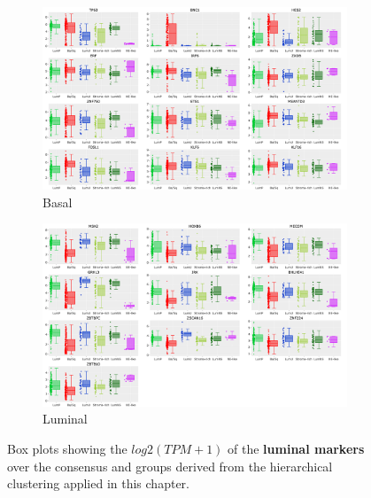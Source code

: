 \begin{figure}[!htb]
    \captionsetup[subfigure]{justification=Centering}
  \begin{subfigure}[!t]{0.95\textwidth}
    \includegraphics[width=1.0\textwidth,height=1.0\textheight,keepaspectratio]{Sections/Network_I/Resources/selective_pruning/log2_consensus_basal.png}
    \caption{Basal}
    \label{fig:ap:box_basal_consensus}
    \end{subfigure}
  \begin{subfigure}[!t]{0.95\textwidth}
      \includegraphics[width=1.0\textwidth,height=1.0\textheight,keepaspectratio]{Sections/Network_I/Resources/selective_pruning/log2_consensus_lum.png}
      \caption{Luminal}
      \label{fig:ap:box_luminal_consensus}
  \end{subfigure}
  \caption{Box plots showing the $log2(TPM+1)$ of the \textbf{luminal markers} over the consensus and groups derived from the hierarchical clustering applied in this chapter.}
  \label{fig:ap:box_consensus}
\end{figure}




